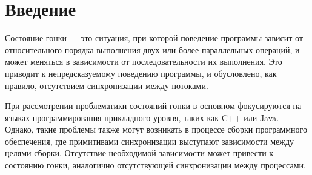 \section{Введение}
\label{sec:Chapter0} 


Состояние гонки --- это ситуация, при которой поведение программы зависит от относительного порядка выполнения двух или более параллельных операций, и может меняться в зависимости от последовательности их выполнения. Это приводит к непредсказуемому поведению программы, и обусловлено, как правило, отсутствием синхронизации между потоками.

При рассмотрении проблематики состояний гонки в основном фокусируются на языках программирования прикладного уровня, таких как C++ или Java. Однако, такие проблемы также могут возникать в процессе сборки программного обеспечения, где примитивами синхронизации выступают зависимости между целями сборки. Отсутствие необходимой зависимости может привести к состоянию гонки, аналогично отсутствующей синхронизации между процессами.

